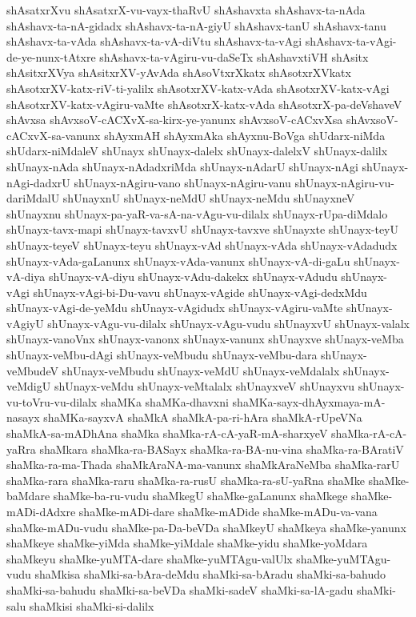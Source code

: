 {shAsatxrXvu
shAsatxrX-vu-vayx-thaRvU
shAshavxta
shAshavx-ta-nAda
shAshavx-ta-nA-gidadx
shAshavx-ta-nA-giyU
shAshavx-tanU
shAshavx-tanu
shAshavx-ta-vAda
shAshavx-ta-vA-diVtu
shAshavx-ta-vAgi
shAshavx-ta-vAgi-de-ye-nunx-tAtxre
shAshavx-ta-vAgiru-vu-daSeTx
shAshavxtiVH
shAsitx
shAsitxrXVya
shAsitxrXV-yAvAda
shAsoVtxrXkatx
shAsotxrXVkatx
shAsotxrXV-katx-riV-ti-yalilx
shAsotxrXV-katx-vAda
shAsotxrXV-katx-vAgi
shAsotxrXV-katx-vAgiru-vaMte
shAsotxrX-katx-vAda
shAsotxrX-pa-deVshaveV
shAvxsa
shAvxsoV-cACXvX-sa-kirx-ye-yanunx
shAvxsoV-cACxvXsa
shAvxsoV-cACxvX-sa-vanunx
shAyxmAH
shAyxmAka
shAyxnu-BoVga
shUdarx-niMda
shUdarx-niMdaleV
shUnayx
shUnayx-dalelx
shUnayx-dalelxV
shUnayx-dalilx
shUnayx-nAda
shUnayx-nAdadxriMda
shUnayx-nAdarU
shUnayx-nAgi
shUnayx-nAgi-dadxrU
shUnayx-nAgiru-vano
shUnayx-nAgiru-vanu
shUnayx-nAgiru-vu-dariMdalU
shUnayxnU
shUnayx-neMdU
shUnayx-neMdu
shUnayxneV
shUnayxnu
shUnayx-pa-yaR-va-sA-na-vAgu-vu-dilalx
shUnayx-rUpa-diMdalo
shUnayx-tavx-mapi
shUnayx-tavxvU
shUnayx-tavxve
shUnayxte
shUnayx-teyU
shUnayx-teyeV
shUnayx-teyu
shUnayx-vAd
shUnayx-vAda
shUnayx-vAdadudx
shUnayx-vAda-gaLanunx
shUnayx-vAda-vanunx
shUnayx-vA-di-gaLu
shUnayx-vA-diya
shUnayx-vA-diyu
shUnayx-vAdu-dakekx
shUnayx-vAdudu
shUnayx-vAgi
shUnayx-vAgi-bi-Du-vavu
shUnayx-vAgide
shUnayx-vAgi-dedxMdu
shUnayx-vAgi-de-yeMdu
shUnayx-vAgidudx
shUnayx-vAgiru-vaMte
shUnayx-vAgiyU
shUnayx-vAgu-vu-dilalx
shUnayx-vAgu-vudu
shUnayxvU
shUnayx-valalx
shUnayx-vanoVnx
shUnayx-vanonx
shUnayx-vanunx
shUnayxve
shUnayx-veMba
shUnayx-veMbu-dAgi
shUnayx-veMbudu
shUnayx-veMbu-dara
shUnayx-veMbudeV
shUnayx-veMbudu
shUnayx-veMdU
shUnayx-veMdalalx
shUnayx-veMdigU
shUnayx-veMdu
shUnayx-veMtalalx
shUnayxveV
shUnayxvu
shUnayx-vu-toVru-vu-dilalx
shaMKa
shaMKa-dhavxni
shaMKa-sayx-dhAyxmaya-mA-nasayx
shaMKa-sayxvA
shaMkA
shaMkA-pa-ri-hAra
shaMkA-rUpeVNa
shaMkA-sa-mADhAna
shaMka
shaMka-rA-cA-yaR-mA-sharxyeV
shaMka-rA-cA-yaRra
shaMkara
shaMka-ra-BASayx
shaMka-ra-BA-nu-vina
shaMka-ra-BAratiV
shaMka-ra-ma-Thada
shaMkAraNA-ma-vanunx
shaMkAraNeMba
shaMka-rarU
shaMka-rara
shaMka-raru
shaMka-ra-rusU
shaMka-ra-sU-yaRna
shaMke
shaMke-baMdare
shaMke-ba-ru-vudu
shaMkegU
shaMke-gaLanunx
shaMkege
shaMke-mADi-dAdxre
shaMke-mADi-dare
shaMke-mADide
shaMke-mADu-va-vana
shaMke-mADu-vudu
shaMke-pa-Da-beVDa
shaMkeyU
shaMkeya
shaMke-yanunx
shaMkeye
shaMke-yiMda
shaMke-yiMdale
shaMke-yidu
shaMke-yoMdara
shaMkeyu
shaMke-yuMTA-dare
shaMke-yuMTAgu-valUlx
shaMke-yuMTAgu-vudu
shaMkisa
shaMki-sa-bAra-deMdu
shaMki-sa-bAradu
shaMki-sa-bahudo
shaMki-sa-bahudu
shaMki-sa-beVDa
shaMki-sadeV
shaMki-sa-lA-gadu
shaMki-salu
shaMkisi
shaMki-si-dalilx
}

